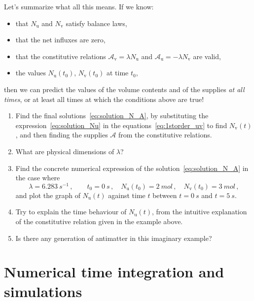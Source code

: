 \documentclass[a4paper,12pt,%
onecolumn,oneside,%
british%
]{memoir}
\renewcommand*{\|}[1][]{\nonscript\:#1\vert\nonscript\:\mathopen{}}
\newcommand*{\yti}{t_{0}}
\newcommand*{\yN}{N}
\newcommand*{\ya}{\mathcal{A}}
\newcommand*{\yNu}{\yN_{\text{u}}}
\newcommand*{\yNv}{\yN_{\text{v}}}
\newcommand*{\yau}{\ya_{\text{u}}}
\newcommand*{\yav}{\ya_{\text{v}}}
\begin{document}
\medskip

Let's summarize what all this means. If we know:
\begin{itemize}
\item that $\yNu$ and $\yNv$ satisfy balance laws,
\item that the net influxes are zero,
\item that the constitutive relations $\yav = \lambda \yNu$ and $\yau = -\lambda \yNv$ are valid,
\item the values $\yNu(\yti)$, $\yNv(\yti)$ at time $\yti$,
\end{itemize}
then we can predict the values of the volume contents and of the supplies \emph{at all times}, or at least all times at which the conditions above are true!


\begin{exercise}
  \begin{enumerate}[exerc]
  \item Find the final solutions~\eqref{eq:solution_N_A}, by substituting the expression~\eqref{eq:solution_Nu} in the equations~\eqref{eq:1storder_uv} to find $\yNv(t)$, and then finding the supplies $\ya$ from the constitutive relations.
\item What are physical dimensions of $\lambda$?
\item Find the concrete numerical expression of the solution~\eqref{eq:solution_N_A} in the case where
    \begin{equation*}
      \lambda = \qty{6.283}{s^{-1}} \,,
      \qquad
      \yti = \qty{0}{s}\,,
      \quad
      \yNu(\yti) = \qty{2}{mol} \,,
      \quad
      \yNv(\yti) = \qty{3}{mol} \,,
    \end{equation*}
  and plot the graph of $\yNu(t)$ against time $t$ between $t=\qty{0}{s}$ and $t=\qty{5}{s}$.
\item Try to explain the time behaviour of $\yNu(t)$, from the intuitive explanation of the constitutive relation given in the example above.
\item Is there any generation of antimatter in this imaginary example?
  \end{enumerate}
\end{exercise}

\section{Numerical time integration and simulations}
\label{sec:numeric_simulation}

\end{document}
